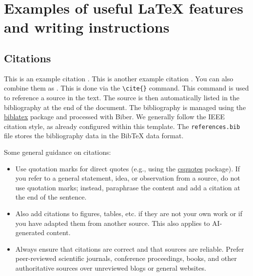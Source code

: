 \chapter{Examples of useful LaTeX features and writing instructions}
\label{cha:hints}

\section{Citations}
\label{sec:citations}
This is an example citation \cite{WaBo2016}. This is another example citation \cite{wallscheid2014real}. You can also combine them as \cite{WaBo2016,wallscheid2014real}. This is done via the \verb|\cite{}| command. This command is used to reference a source in the text. The source is then automatically listed in the bibliography at the end of the document. The bibliography is managed using the \href{https://ctan.org/pkg/biblatex}{biblatex} package and processed with Biber. We generally follow the IEEE citation style, as already configured within this template. The \texttt{references.bib} file stores the bibliography data in the BibTeX data format.

Some general guidance on citations:
\begin{itemize}
	\item Use quotation marks for direct quotes (e.g., using the \href{https://ctan.org/pkg/csquotes}{csquotes} package). If you refer to a general statement, idea, or observation from a source, do not use quotation marks; instead, paraphrase the content and add a citation at the end of the sentence.
	\item Also add citations to figures, tables, etc. if they are not your own work or if you have adapted them from another source. This also applies to AI-generated content.
	\item Always ensure that citations are correct and that sources are reliable. Prefer peer-reviewed scientific journals, conference proceedings, books, and other authoritative sources over unreviewed blogs or general websites.
\end{itemize}

